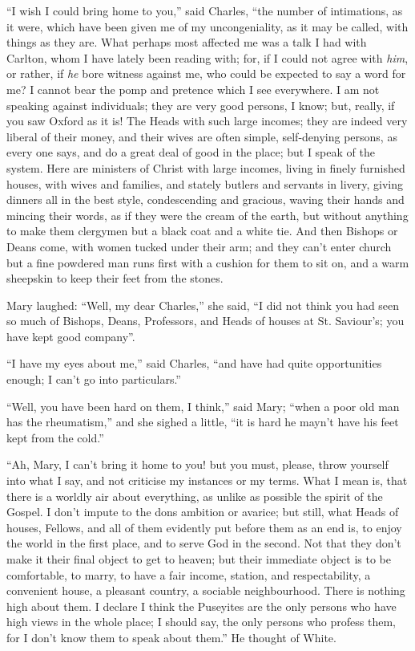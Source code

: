 ``I wish I could bring home to you,'' said Charles,
``the number of intimations, as it were, which have been given me
of my uncongeniality, as it may be called, with things as they are.
What perhaps most affected me was a talk I had with Carlton, whom I
have lately been reading with; for, if I could not agree with \emph{him},
or rather, if \emph{he} bore witness against me, who could be expected
to say a word for me? I cannot bear the pomp and pretence which I see
everywhere. I am not speaking against individuals; they are very good
persons, I know; but, really, if you saw Oxford as it is! The Heads
with such large incomes; they are indeed very liberal of their money,
and their wives are often simple, self-denying persons, as every one
says, and do a great deal of good in the place; but I speak of the
system. Here are ministers of Christ with large incomes, living in
finely furnished houses, with wives and families, and stately butlers
and servants in livery, giving dinners all in the best style,
condescending and gracious, waving their hands and mincing their
words, as if they were the cream of the earth, but without anything to
make them clergymen but a black coat and a white tie. And then Bishops
or Deans come, with women tucked under their arm; and they can't enter
church but a fine powdered man runs first with a cushion for them to
sit on, and a warm sheepskin to keep their feet from the stones.

Mary laughed: ``Well, my dear Charles,'' she said, ``I
did not think you had seen so much of Bishops, Deans, Professors, and
Heads of houses at St. Saviour's; you have kept good company''.

``I have my eyes about me,'' said Charles, ``and have
had quite opportunities enough; I can't go into particulars.''

``Well, you have been hard on them, I think,'' said Mary;
``when a poor old man has the rheumatism,'' and she sighed a
little, ``it is hard he mayn't have his feet kept from the
cold.''

``Ah, Mary, I can't bring it home to you! but you must, please,
throw yourself into what I say, and not criticise my instances or my
terms. What I mean is, that there is a worldly air about everything,
as unlike as possible the spirit of the Gospel. I don't impute to the
dons ambition or avarice; but still, what Heads of houses, Fellows,
and all of them evidently put before them as an end is, to enjoy the
world in the first place, and to serve God in the second. Not that
they don't make it their final object to get to heaven; but their
immediate object is to be comfortable, to marry, to have a fair
income, station, and respectability, a convenient house, a pleasant
country, a sociable neighbourhood. There is nothing high about them. I
declare I think the Puseyites are the only persons who have high views
in the whole place; I should say, the only persons who profess them,
for I don't know them to speak about them.'' He thought of White.

